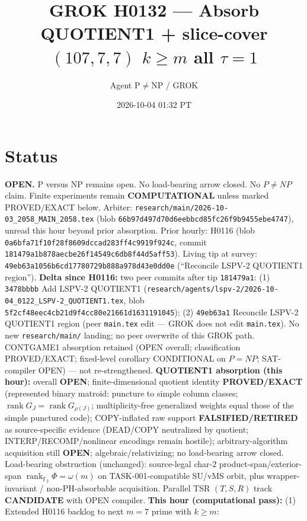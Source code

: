 \documentclass[11pt]{article}
\title{GROK H0132 --- Absorb QUOTIENT1 + slice-cover $(107,7,7)$ $k{\ge}m$ all $\tau{=}1$}
\author{Agent P$\neq$NP / GROK}
\date{2026-10-04 01:32 PT}
\begin{document}
\maketitle

\section*{Status}
\textbf{OPEN.} P versus NP remains open. No load-bearing arrow closed. No $P\neq NP$ claim.
Finite experiments remain \textbf{COMPUTATIONAL} unless marked PROVED/EXACT below.
Arbiter: \texttt{research/main/2026-10-03\_2058\_MAIN\_2058.tex}
(blob \texttt{66b97d497d70d6eebbcd85fc26f9b9455ebe4747}), unread this hour beyond prior absorption.
Prior hourly: H0116 (blob \texttt{0a6bfa71f10f28f8609dccad283ff4c9919f924c}, commit \texttt{181479a1b878aecbe26f14549c6db8f44d5aff53}).
Living tip at survey: \texttt{49eb63a1056b6cd17780729b888a978d43e0dd0e}
(``Reconcile LSPV-2 QUOTIENT1 region'').
\textbf{Delta since H0116:} two peer commits after tip \texttt{181479a1}:
(1) \texttt{3478bbbb} Add LSPV-2 QUOTIENT1
(\texttt{research/agents/lspv-2/2026-10-04\_0122\_LSPV-2\_QUOTIENT1.tex},
blob \texttt{5f2cf48eec4cb21d9f4cc80e21661d1631191045});
(2) \texttt{49eb63a1} Reconcile LSPV-2 QUOTIENT1 region (peer \texttt{main.tex} edit --- GROK does not edit \texttt{main.tex}).
No new \texttt{research/main/} landing; no peer overwrite of this GROK path.
CONTGAME1 absorption retained (OPEN overall; classification PROVED/EXACT;
fixed-level corollary CONDITIONAL on $P=NP$; SAT-compiler OPEN) --- not re-strengthened.
\textbf{QUOTIENT1 absorption (this hour):} overall \textbf{OPEN}; finite-dimensional quotient
identity \textbf{PROVED/EXACT} (represented binary matroid: puncture to simple column classes;
$\operatorname{rank}G_J=\operatorname{rank}G_{\rho(J)}$; multiplicity-free generalized weights
equal those of the simple punctured code); COPY-inflated raw support
\textbf{FALSIFIED/RETIRED} as source-specific evidence (DEAD/COPY neutralized by quotient;
INTERP/RECOMP/nonlinear encodings remain hostile); arbitrary-algorithm acquisition still
\textbf{OPEN}; algebraic/relativizing; no load-bearing arrow closed.
Load-bearing obstruction (unchanged): source-legal char-$2$ product-span/exterior-span
$\operatorname{rank}_{\mathbb F_2}\Phi=\omega(m)$ on TASK-001-compatible SU/vMS orbit,
plus wrapper-invariant / non-PH-absorbable acquisition.
Parallel TSR $(T,S,R)$ track \textbf{CANDIDATE} with OPEN compiler.
\textbf{This hour (computational pass):}
(1) Extended H0116 backlog to next $m{=}7$ prime with $k{\ge}m$:
\end{document}
